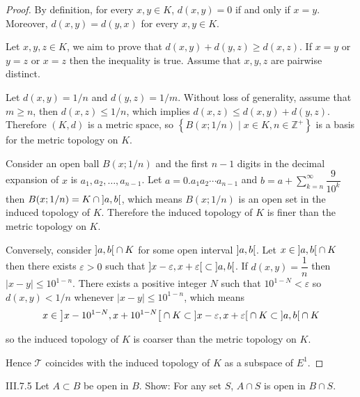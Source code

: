 \begin{proof}
    By definition, for every \( x, y \in K \), \( d(x, y) = 0 \) if and only if \( x = y \). Moreover, \( d(x, y) = d(y, x) \) for every \( x, y \in K \).

    Let \( x, y, z \in K \), we aim to prove that \( d(x, y) + d(y, z) \ge d(x, z) \). If \( x = y \) or \( y = z \) or \( x = z \) then the inequality is true. Assume that \( x, y, z \) are pairwise distinct.

    Let \( d(x, y) = 1/n \) and \( d(y, z) = 1/m \). Without loss of generality, assume that \( m \ge n \), then \( d(x, z) \le 1/n \), which implies \( d(x, z) \le d(x, y) + d(y, z) \). Therefore \( (K, d) \) is a metric space, so \( \left\{ B(x; 1/n) \mid x \in K, n \in \mathbb{Z}^{+} \right\} \) is a basis for the metric topology on \( K \).

    Consider an open ball \( B(x; 1/n) \) and the first \( n - 1 \) digits in the decimal expansion of \( x \) is \( a_{1}, a_{2}, \ldots, a_{n-1} \). Let \( a = 0.a_{1}a_{2}\cdots a_{n-1} \) and \( b = a + \sum^{\infty}_{k=n}\dfrac{9}{10^{k}} \) then \( B(x; 1/n) = K \cap \left]{a, b}\right[ \), which means \( B(x; 1/n) \) is an open set in the induced topology of \( K \). Therefore the induced topology of \(K\) is finer than the metric topology on \( K \).

    Conversely, consider \( \left]{a, b}\right[ \cap K \) for some open interval \( \left]{a, b}\right[ \). Let \( x \in \left]{a, b}\right[ \cap K \) then there exists \( \varepsilon > 0 \) such that \( \left]{x - \varepsilon, x + \varepsilon}\right[ \subset \left]{a, b}\right[ \). If \( d(x, y) = \dfrac{1}{n} \) then \( \left\vert{x - y}\right\vert \le 10^{1-n} \). There exists a positive integer \(N\) such that \( 10^{1-N} < \varepsilon \) so \( d(x, y) < 1/n \) whenever \( \left\vert{x - y}\right\vert \le 10^{1-n} \), which means
    \[
        x \in \left]{x - 10^{1-N}, x + 10^{1-N}}\right[ \cap K \subset \left]{x - \varepsilon, x + \varepsilon}\right[ \cap K \subset \left]{a, b}\right[ \cap K
    \]

    so the induced topology of \( K \) is coarser than the metric topology on \( K \).

    Hence \( \mathscr{T} \) coincides with the induced topology of \(K\) as a subspace of \( E^{1} \).
\end{proof}

\begin{problem}{III.7.5}
Let \(A \subset B\) be open in \(B\). Show: For any set \( S \), \( A \cap S \) is open in \( B \cap S \).
\end{problem}

